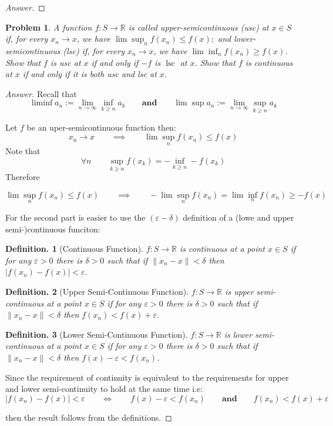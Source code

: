 \documentclass{article}
\newtheorem{defin}{Definition.}
\newtheorem{problem}{Problem}[section]
\newcommand{\qiq}{\qquad \implies \qquad}
\newcommand{\qiffq}{\qquad \iff \qquad}
\newcommand{\qaq}{\qquad \textbf{and} \qquad}
\begin{document}
\begin{proof}[Answer]
    
\end{proof}

\begin{problem}
    A function $f: S \rightarrow \mathbb{R}$ is called upper-semicontinuous (usc) at $x \in S$ if, for every $x_{n} \rightarrow x$, we have $\lim \sup _{n} f\left(x_{n}\right) \leq f(x) ;$ and lower-semicontinuous (lsc) if, for every $x_{n} \rightarrow x$, we have $\lim \inf _{n} f\left(x_{n}\right) \geq f(x)$. Show that $f$ is usc at $x$ if and only if $-f$ is $\operatorname{lsc}$ at $x$. Show that $f$ is continuous at $x$ if and only if it is both usc and lsc at $x$. 
\end{problem}

\begin{proof}[Answer]
    Recall that
    $$\liminf a_{n}:=\lim _{n \rightarrow \infty} \inf _{k \geq n} a_{k} \qaq \lim \sup a_{n}:=\lim _{n \rightarrow \infty} \sup _{k \geq n} a_{k}$$

    Let $f$ be an uper-semicontinuous function then:
    $$x_n \to x \qiq   \lim \sup _{n} f\left(x_{n}\right) \leq f(x)$$
    Note that  $$\forall n \qquad  \sup_{k\geq n} f(x_k) = -\inf_{k\geq n} -f(x_k) $$
    Therefore
    
    $$\lim \sup _{n} f\left(x_{n}\right) \leq f(x) \qiq -\lim \sup _{n} f\left(x_{n}\right)= \lim \inf _{n} f\left(x_{n}\right)\geq -f(x)$$

    For the second part is easier to use the $(\varepsilon-\delta)$ definition of a (lowe and upper semi-)continuous funciton:

    \begin{defin}[Continuous Function]
        $f: S \rightarrow \mathbb{R}$ is continuous at a point $x\in S$ if for any $\varepsilon>0$ there is $\delta >0$ such that if $\|x_n - x\|<\delta$ then $|f(x_n)-f(x)|<\varepsilon$.
    \end{defin}

    \begin{defin}[Upper Semi-Continuous Function]
        $f: S \rightarrow \mathbb{R}$ is upper semi-continuous at a point $x\in S$ if for any $\varepsilon>0$ there is $\delta >0$ such that if $\|x_n - x\|<\delta$ then $f(x_n)<f(x)+\varepsilon$.
    \end{defin}
    
    \begin{defin}[Lower Semi-Continuous Function]
        $f: S \rightarrow \mathbb{R}$ is lower semi-continuous at a point $x\in S$ if for any $\varepsilon>0$ there is $\delta >0$ such that if $\|x_n - x\|<\delta$ then $f(x) - \varepsilon<f(x_n)$.
    \end{defin}

    Since the requirement of continuity is equivalent to the requirements for upper and lower semi-continuity to hold at the same time i.e:
    $$|f(x_n)-f(x)|<\varepsilon \qiffq f(x) -\varepsilon < f(x_n) \qaq f(x_n) < f(x) + \varepsilon$$

    then the result follows from the definitions.

\end{proof}
\end{document}
